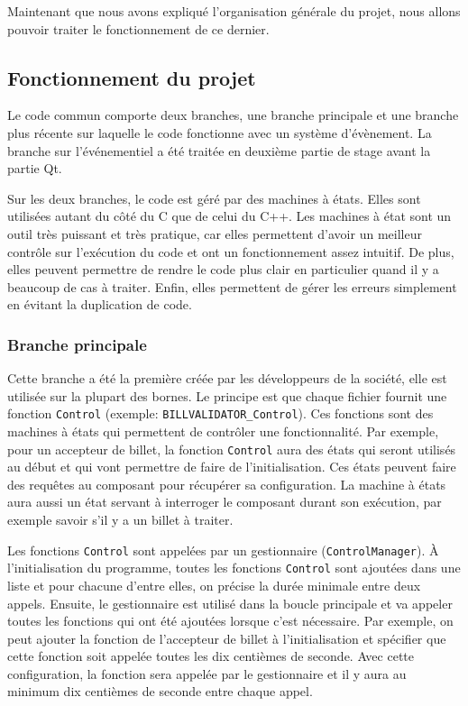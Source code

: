 \documentclass[a4paper]{article}
\begin{document}
Maintenant que nous avons expliqué l'organisation générale du projet, nous
allons pouvoir traiter le fonctionnement de ce dernier.

\subsection{Fonctionnement du projet}

Le code commun comporte deux branches, une branche principale et une branche
plus récente sur laquelle le code fonctionne avec un système d'évènement. La
branche sur l'événementiel a été traitée en deuxième partie de stage avant la
partie Qt.

Sur les deux branches, le code est géré par des machines à états. Elles sont
utilisées autant du côté du C que de celui du C++. Les machines à état sont un
outil très puissant et très pratique, car elles permettent d'avoir un meilleur
contrôle sur l'exécution du code et ont un fonctionnement assez intuitif. De
plus, elles peuvent permettre de rendre le code plus clair en particulier quand
il y a beaucoup de cas à traiter. Enfin, elles permettent de gérer les erreurs
simplement en évitant la duplication de code.

\subsubsection{Branche principale}

Cette branche a été la première créée par les développeurs de la société, elle
est utilisée sur la plupart des bornes. Le principe est que chaque fichier
fournit une fonction \verb|Control| (exemple: \verb|BILLVALIDATOR_Control|). Ces
fonctions sont des machines à états qui permettent de contrôler une
fonctionnalité. Par exemple, pour un accepteur de billet, la fonction
\verb|Control| aura des états qui seront utilisés au début et qui vont permettre
de faire de l'initialisation. Ces états peuvent faire des requêtes au composant
pour récupérer sa configuration. La machine à états aura aussi un état servant à
interroger le composant durant son exécution, par exemple savoir s'il y a
un billet à traiter.

Les fonctions \verb|Control| sont appelées par un gestionnaire
(\verb|ControlManager|). À l'initialisation du programme, toutes les fonctions
\verb|Control| sont ajoutées dans une liste et pour chacune d'entre elles, on
précise la durée minimale entre deux appels. Ensuite, le gestionnaire est
utilisé dans la boucle principale et va appeler toutes les fonctions qui ont été
ajoutées lorsque c'est nécessaire. Par exemple, on peut ajouter la fonction de
l'accepteur de billet à l'initialisation et spécifier que cette fonction soit
appelée toutes les dix centièmes de seconde. Avec cette configuration, la
fonction sera appelée par le gestionnaire et il y aura au minimum dix centièmes
de seconde entre chaque appel.
\end{document}
